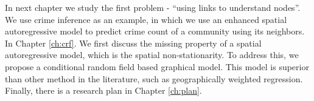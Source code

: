 In next chapter we study the first problem - ``using links to understand nodes''. We use crime inference as an example, in which we use an enhanced spatial autoregressive model to predict crime count of a community using its neighbors. In Chapter \ref{ch:crf}. We first discuss the missing property of a spatial autoregressive model, which is the spatial non-stationarity. To address this, we propose a conditional random field based  graphical model. This model is superior than other method in the literature, such as geographically weighted regression. Finally, there is a research plan in Chapter \ref{ch:plan}.



